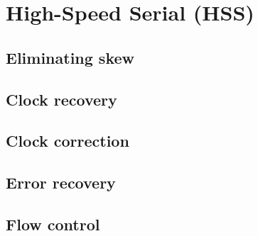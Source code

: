 	\section{High-Speed Serial (HSS)}
		\label{sec:high-speed-serial}
		
		
		\subsection{Eliminating skew}
			
		
		\subsection{Clock recovery}
			
		
		\subsection{Clock correction}
			
		
		\subsection{Error recovery}
			
		
		\subsection{Flow control}
			
